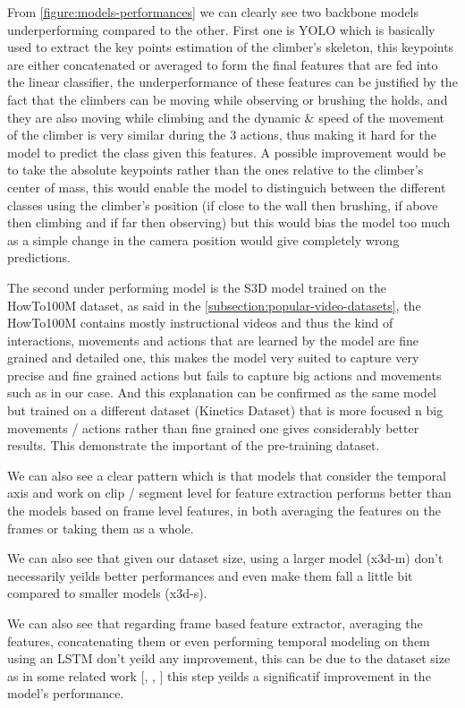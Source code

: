 From \ref{figure:models-performances} we can clearly see two backbone models underperforming compared to the other. First one is YOLO which is basically used to extract the key points estimation of the climber's skeleton, this keypoints are either concatenated or averaged to form the final features that are fed into the linear classifier, the underperformance of these features can be justified by the fact that the climbers can be moving while observing or brushing the holds, and they are also moving while climbing and the dynamic \& speed of the movement of the climber is very similar during the 3 actions, thus making it hard for the model to predict the class given this features. A possible improvement would be to take the absolute keypoints rather than the ones relative to the climber's center of mass, this would enable the model to distinguich between the different classes using the climber's position (if close to the wall then brushing, if above then climbing and if far then observing) but this would bias the model too much as a simple change in the camera position would give completely wrong predictions. 

The second under performing model is the S3D model trained on the HowTo100M dataset, as said in the \ref{subsection:popular-video-datasets}, the HowTo100M contains mostly instructional videos and thus the kind of interactions, movements and actions that are learned by the model are fine grained and detailed one, this makes the model very suited to capture very precise and fine grained actions but fails to capture big actions and movements such as in our case.
And this explanation can be confirmed as the same model but trained on a different dataset (Kinetics Dataset) that is more focused n big movements / actions rather than fine grained one gives considerably better results.
This demonstrate the important of the pre-training dataset.

We can also see a clear pattern which is that models that consider the temporal axis and work on clip / segment level for feature extraction performs better than the models based on frame level features, in both averaging the features on the frames or taking them as a whole.

We can also see that given our dataset size, using a larger model (x3d-m) don't necessarily yeilds better performances and even make them fall a little bit compared to smaller models (x3d-s).

We can also see that regarding frame based feature extractor, averaging the features, concatenating them or even performing temporal modeling on them using an LSTM don't yeild any improvement, this can be due to the dataset size as in some related work [\cite{example-paper-doing-temporal-modeling}, \cite{example-paper-doing-temporal-modeling}, \cite{example-paper-doing-temporal-modeling}] this step yeilds a significatif improvement in the model's performance.

